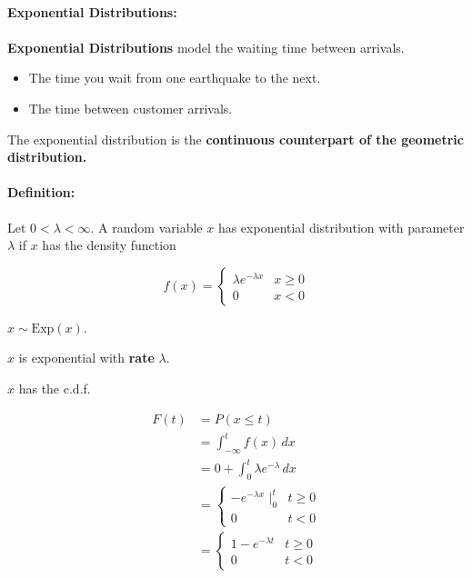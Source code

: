 \documentclass[letterpaper,12pt]{article}
\begin{document}
\paragraph{Exponential Distributions:}

\paragraph{}
\textbf{Exponential Distributions} model the waiting time between arrivals.


\begin{itemize}
    \item The time you wait from one earthquake to the next.
    \item The time between customer arrivals.
\end{itemize}


The exponential distribution is the \textbf{continuous counterpart of the geometric distribution.}


\paragraph{Definition:}


Let $0 < \lambda < \infty$. A random variable $x$ has exponential distribution with parameter $\lambda$
if $x$ has the density function 

\[ f(x) = \begin{cases}
    \lambda e^{-\lambda x} & x \geq 0\\
    0 & x < 0
    \end{cases}
\]


$x \sim \mathrm{Exp}(x)$. 


$x$ is exponential with \textbf{rate} $\lambda$.


$x$ has the c.d.f. 

\begin{align*}
    F(t) &= P(x \leq t)\\
         &= \int_{-\infty}^t f(x)\, dx \\
         &= 0 + \int_0^t \lambda e^{-\lambda}\, dx\\
         &= \begin{cases}
             -e^{-\lambda x}\,\, \bigg|_0^t & t \geq 0\\
             0 & t < 0
             \end{cases}\\
         &= \begin{cases}
             1-e^{-\lambda t} & t \geq 0\\
             0 & t < 0
             \end{cases}
\end{align*}
\end{document}
